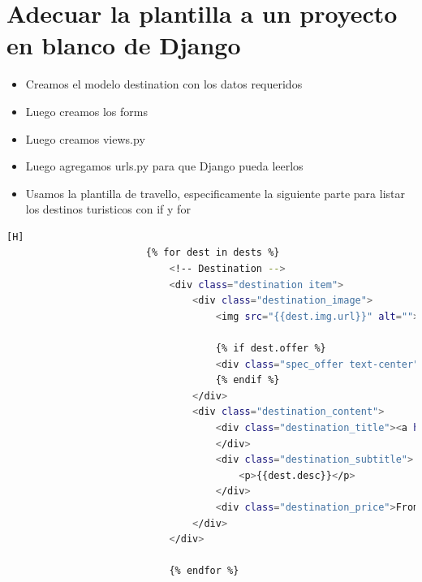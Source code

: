\documentclass{article}
\begin{document}
\section{Adecuar la plantilla a un proyecto en blanco de Django}
	\begin{itemize}
		\item Creamos el modelo destination con los datos requeridos
	\end{itemize}

	\begin{itemize}
		\item Luego creamos los forms 
	\end{itemize}

	\begin{itemize}
		\item Luego creamos views.py
	\end{itemize}	

	\begin{itemize}
		\item Luego agregamos urls.py para que Django pueda leerlos
	\end{itemize}	
	
	\begin{itemize}
		\item Usamos la  plantilla de travello, especificamente la siguiente parte para listar los destinos turisticos con if y for
	\end{itemize}	
	\begin{lstlisting}[language=bash,caption={Pedazo de html donde se usa  for e if}][H]
						{% for dest in dests %}
							<!-- Destination -->
							<div class="destination item">
								<div class="destination_image">
									<img src="{{dest.img.url}}" alt="">

									{% if dest.offer %}
									<div class="spec_offer text-center"><a href="#">Special Offer</a></div>
									{% endif %}
								</div>
								<div class="destination_content">
									<div class="destination_title"><a href="destinations.html">{{dest.name}}</a>
									</div>
									<div class="destination_subtitle">
										<p>{{dest.desc}}</p>
									</div>
									<div class="destination_price">From ${{dest.price}}</div>
								</div>
							</div>

							{% endfor %}

	\end{lstlisting}
\end{document}
